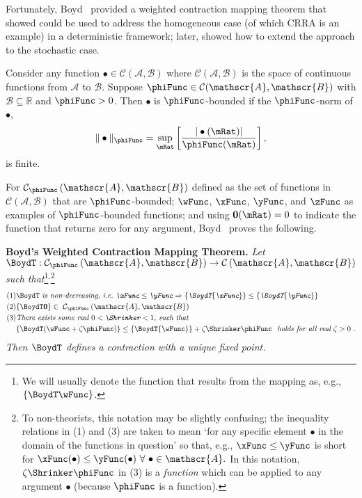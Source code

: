\documentclass[BufferStockTheory]{subfiles}
\begin{document}
Fortunately, Boyd~\citeyearpar{jboydWeighted} provided a weighted contraction mapping theorem that \cite{asHomogeneous} showed could be used to address the homogeneous case (of which CRRA is an example) in a deterministic framework; later, \cite{duranDiscounting} showed how to extend the \cite{jboydWeighted} approach to the stochastic case.
\begin{defn}
  Consider any function $\bullet\in \mathcal{C}(\mathscr{A},\mathscr{B})$ where $\mathcal{C}(\mathscr{A},\mathscr{B})$ is the space of continuous functions from $\mathscr{A}$ to $%
  \mathscr{B}$. Suppose $\phiFunc \in \mathcal{C}(\mathscr{A},\mathscr{B})$ with $%
  \mathscr{B}\subseteq\mathbb{R}$ and $\phiFunc >0$. Then $\bullet$ is $\phiFunc$-bounded if the $\phiFunc$-norm of $\bullet$,
  \begin{equation}
    \Vert \bullet\Vert _{\phiFunc }=\sup_{\mRat}\left[ \frac{|\bullet(\mRat)|}{\phiFunc (\mRat)}\right] ,
    \label{eq:phinorm}
  \end{equation}%
  is finite.
\end{defn}

For $\mathcal{C}_{\phiFunc }\left( \mathscr{A},\mathscr{B}\right) $
defined as the set of functions in
$\mathcal{C}(\mathscr{A},\mathscr{B})$ that are $\phiFunc$-bounded;
$\wFunc$, $\xFunc$, $\yFunc$, and $\zFunc$ as examples of
$\phiFunc$-bounded functions; and using {$\mathbf{0}(\mRat)=0$} to
indicate the function that returns zero for any argument,
Boyd~\citeyearpar{jboydWeighted} proves the following.

\textbf{Boyd's Weighted Contraction Mapping Theorem.} \textit{Let $\BoydT:\mathcal{C}_{\phiFunc }\left( \mathscr{A},\mathscr{B}\right)
  \rightarrow \mathcal{C}\left( \mathscr{A},\mathscr{B}\right) $ such
  that}\footnote{We will usually denote the function that results from the mapping as, e.g., $\{\BoydT\wFunc\}$.}$^,$\footnote{To non-theorists, this notation may be slightly confusing; the inequality relations in (1) and (3) are taken to mean `for any specific element $\bullet$ in the domain of the functions in question' so that, e.g., $\xFunc \leq \yFunc$ is short for $\xFunc(\bullet) \leq \yFunc(\bullet)~\forall~\bullet\in \mathscr{A}.$  In this notation, $\zeta \Shrinker \phiFunc$ in (3) is a {\it function} which can be applied to any argument $\bullet$ (because $\phiFunc$ is a function).} \nopagebreak
\begin{align*}
  \mbox{(1)} &\BoydT%
               \mbox{ {\it is non-decreasing, i.e.\ ${\xFunc} \leq {\yFunc}\Rightarrow
               \{\BoydT{\xFunc}\} \leq \{\BoydT{\yFunc}\}$}}   \nonumber \\
  \mbox{(2)} & \{\BoydT\mathbf{0}\}\in ~ \mathcal{C}_{\phiFunc }\left(\mathscr{A},\mathscr{B}\right)  \notag \\
  \mbox{(3)}
             & \mbox{\it There exists some real $0 < \Shrinker < 1$, such that} \\
             & \{\BoydT({\wFunc} +\zeta\phiFunc )\} \leq \{\BoydT{\wFunc}\} +\zeta\Shrinker \phiFunc
               \mbox{ {\it ~holds for all real $\zeta > 0$} }.
\end{align*}%
\textit{Then $\BoydT$ defines a contraction with a unique fixed point.}
\end{document}
